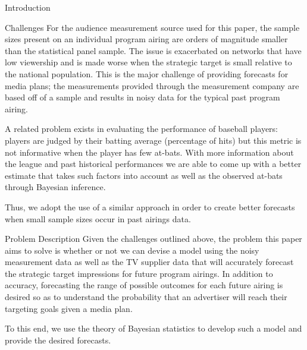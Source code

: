 \begin{chapter}{Introduction}
\begin{section}{Challenges}
  For the audience measurement source used for this paper, the sample sizes
  present on an individual program airing are orders of magnitude smaller than the statistical panel sample.
  The issue is exacerbated on networks that have low viewership and is made worse when
  the strategic target is small relative to the national population.
  This is the major challenge of providing forecasts for media plans;
  the measurements provided through the measurement company are based off of a sample
  and results in noisy data for the typical past program airing.

  A related problem exists in evaluating the performance of baseball players:
  players are judged by their batting average (percentage of hits) but this metric is not informative when
  the player has few at-bats. With more information about the league and past historical performances we are able to
  come up with a better estimate that takes such factors into account
  as well as the observed at-bats through Bayesian inference.

  Thus, we adopt the use of a similar approach in order to create better forecasts when
  small sample sizes occur in past airings data.
\end{section}

\begin{section}{Problem Description}
  Given the challenges outlined above, the problem this paper aims to solve is whether or not
  we can devise a model using
  the noisy measurement data as well as the TV supplier data that will accurately
  forecast the strategic target impressions for future program airings.
  In addition to accuracy, forecasting the range of possible outcomes for each future airing is desired
  so as to understand the probability that an advertiser will reach their targeting goals given a media plan.

  To this end, we use the theory of Bayesian statistics to develop such a model
  and provide the desired forecasts.
\end{section}
\end{chapter}